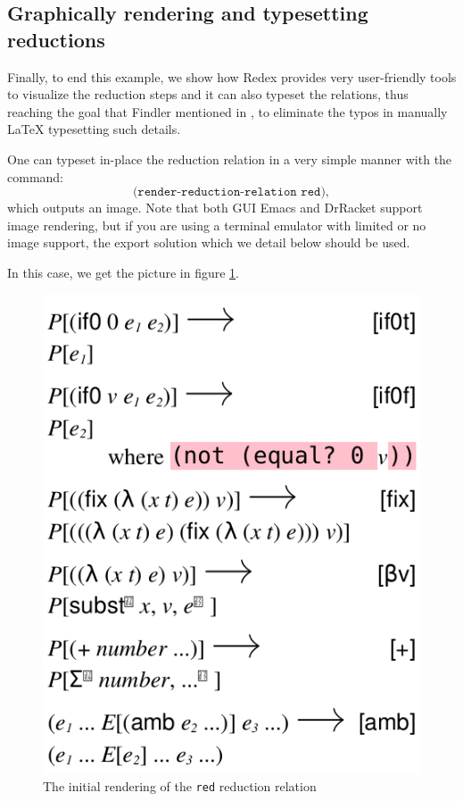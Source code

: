 \subsection{Graphically rendering and typesetting reductions}

Finally, to end this example, we show how Redex provides very user-friendly
tools to visualize the reduction steps and it can also typeset the relations,
thus reaching the goal that Findler mentioned in \cite{popl}, to eliminate
the typos in manually \LaTeX{} typesetting such details.

One can typeset in-place the reduction relation in a very simple manner
with the command:
\[
  \texttt{(render-reduction-relation red)},
\]
which outputs an image. Note that both GUI Emacs and DrRacket support
image rendering, but if you are using a terminal emulator with limited
or no image support, the export solution which we detail below should be used.

In this case, we get the picture in figure \ref{fig:red-pink}.

\begin{figure}[!htb]
  \centering
  \includegraphics[scale=0.3]{fig/red-pink.png}
  \caption{The initial rendering of the \texttt{red} reduction relation}
  \label{fig:red-pink}
\end{figure}


